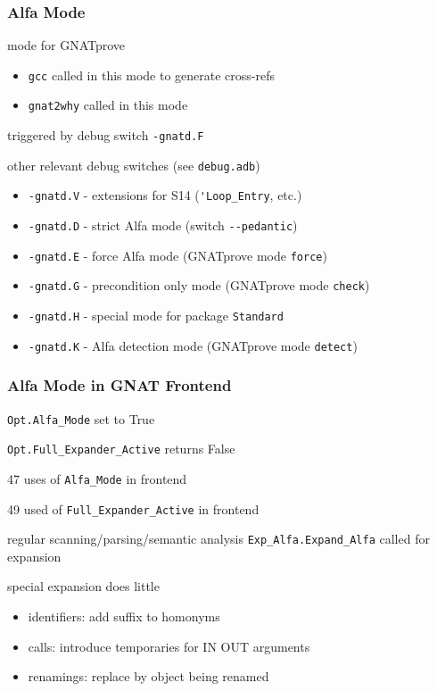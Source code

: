 \documentclass{beamer}
\newcommand{\vs}{\vspace{0.5cm}}
\newenvironment{specialframe}{%
  \begin{frame}[fragile,environment=specialframe]}{\end{frame}}
\begin{document}
\begin{specialframe}
  \frametitle{Alfa Mode}

mode for GNATprove
\begin{itemize}
\item \verb|gcc| called in this mode to generate cross-refs
\item \verb|gnat2why| called in this mode
\end{itemize}

\vs

triggered by debug switch \verb|-gnatd.F|

\vs

other relevant debug switches (see \verb|debug.adb|)
\begin{itemize}
\item \verb|-gnatd.V| - extensions for S14 (\verb|'Loop_Entry|, etc.)
\item \verb|-gnatd.D| - strict Alfa mode (switch \verb|--pedantic|)
\item \verb|-gnatd.E| - force Alfa mode (GNATprove mode \verb|force|)
\item \verb|-gnatd.G| - precondition only mode (GNATprove mode \verb|check|)
\item \verb|-gnatd.H| - special mode for package \verb|Standard|
\item \verb|-gnatd.K| - Alfa detection mode (GNATprove mode \verb|detect|)
\end{itemize}

\end{specialframe}

\begin{specialframe}
  \frametitle{Alfa Mode in GNAT Frontend}

\verb|Opt.Alfa_Mode| set to True

\verb|Opt.Full_Expander_Active| returns False

\vs

47 uses of \verb|Alfa_Mode| in frontend

49 used of \verb|Full_Expander_Active| in frontend

\vs

regular scanning/parsing/semantic analysis
\verb|Exp_Alfa.Expand_Alfa| called for expansion

\vs

special expansion does little
\begin{itemize}
\item identifiers: add suffix to homonyms
\item calls: introduce temporaries for IN OUT arguments
\item renamings: replace by object being renamed
\end{itemize}

\end{specialframe}
\end{document}
